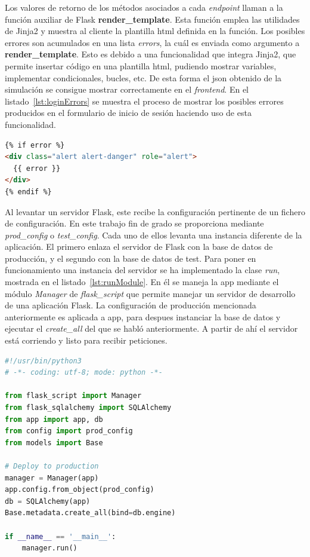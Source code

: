 Los valores de retorno de los métodos asociados a cada \textit{endpoint} llaman a la función auxiliar de Flask \textbf{render\_template}. Esta función emplea las utilidades de Jinja2 y muestra al cliente la plantilla html definida en la función.
Los posibles errores son acumulados en una lista \textit{errors}, la cuál es enviada como argumento a \textbf{render\_template}. Esto es debido a una funcionalidad que integra Jinja2, que permite insertar código en una plantilla html, pudiendo mostrar variables, implementar condicionales, bucles, etc. De esta forma el json obtenido de la simulación se consigue mostrar correctamente en el \textit{frontend}. En el listado~\ref{lst:loginErrors} se muestra el proceso de mostrar los posibles errores producidos en el formulario de inicio de sesión haciendo uso de esta funcionalidad.
\begin{lstlisting}[language=Html,float=ht,caption={Muestreo de errores en el formulario de inicio de sesión},label={lst:loginErrors}]
{% if error %}
<div class="alert alert-danger" role="alert">
  {{ error }}
</div>
{% endif %}
\end{lstlisting}

Al levantar un servidor Flask, este recibe la configuración pertinente de un fichero de configuración. En este trabajo fin de grado se proporciona mediante \textit{prod\_config} o \textit{test\_config}. Cada uno de ellos levanta una instancia diferente de la aplicación. El primero enlaza el servidor de Flask con la base de datos de producción, y el segundo con la base de datos de test. Para poner en funcionamiento una instancia del servidor se ha implementado la clase \textit{run}, mostrada en el listado~\ref{lst:runModule}. En él se maneja la app mediante el módulo \textit{Manager} de \textit{flask\_script} que permite manejar un servidor de desarrollo de una aplicación Flask. La configuración de producción mencionada anteriormente es aplicada a app, para despues instanciar la base de datos y ejecutar el \textit{create\_all} del que se habló anteriormente. A partir de ahí el servidor está corriendo y listo para recibir peticiones.

\begin{lstlisting}[language=Python,float=ht,numbers=none,caption={Módulo \textit{run} para arrancar el servidor},label={lst:runModule}]
#!/usr/bin/python3
# -*- coding: utf-8; mode: python -*-

from flask_script import Manager
from flask_sqlalchemy import SQLAlchemy
from app import app, db
from config import prod_config
from models import Base

# Deploy to production
manager = Manager(app)
app.config.from_object(prod_config)
db = SQLAlchemy(app)
Base.metadata.create_all(bind=db.engine)

if __name__ == '__main__':
    manager.run()
\end{lstlisting}

